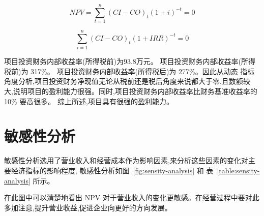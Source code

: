 \begin{equation}
\label{eq:npv}
        NPV = \sum _{t = 1}^{n} (CI - CO)_{t} (1 + i)^{-t} = 0
\end{equation}

\begin{equation}
\label{eq:irr}
        \sum _{i = 1}^{n} (CI - CO)_{t} (1 + IRR)^{-t} = 0
\end{equation}

项目投资财务内部收益率(所得税前)为93.8万元。
项目投资财务内部收益率(所得税前)为 317\%。
项目投资财务内部收益率(所得税后)为 277\%。因此从动态
指标角度分析,项目投资财务净现值无论从税前还是税后角度来说都大于零,且数额较
大,说明项目的盈利能力很强。同时,项目投资财务内部收益率比财务基准收益率的 10\%
要高很多。
综上所述,项目具有很强的盈利能力。

\section{敏感性分析}
敏感性分析选用了营业收入和经营成本作为影响因素,来分析这些因素的变化对主
要经济指标的影响程度, 敏感性分析如图~\ref{fig:sensity-analysis} 和
表~\ref{table:sensity-analysis} 所示。


在此图中可以清楚地看出 NPV 对于营业收入的变化更敏感。在经营过程中要对此
多加注意,提升营业收益,促进企业向更好的方向发展。
